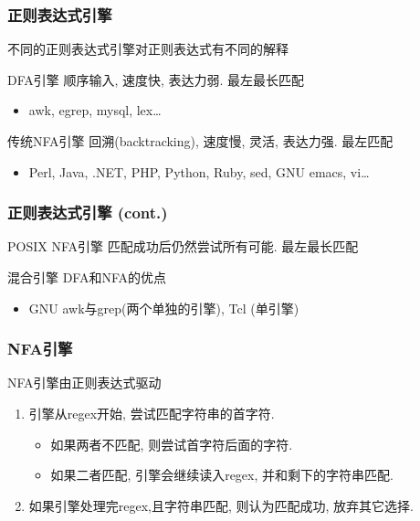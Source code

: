 \documentclass[compress]{beamer}
\begin{document}
\begin{frame}
\frametitle{正则表达式引擎}

不同的正则表达式引擎对正则表达式有不同的解释
\begin{block} {DFA引擎} 
顺序输入, 速度快, 表达力弱. 最左最长匹配
    \begin{itemize}
    \item awk, egrep, mysql, lex\ldots
    \end{itemize}
\end{block}

\begin{block}{传统NFA引擎} 
	回溯(backtracking), 速度慢, 灵活, 表达力强.  最左匹配
    \begin{itemize}
    \item Perl, Java, .NET, PHP, Python, Ruby, sed, GNU emacs, vi\ldots
    \end{itemize}
\end{block}
\end{frame}

\begin{frame}
\frametitle{正则表达式引擎 (cont.)}

\begin{block}{POSIX NFA引擎} 
匹配成功后仍然尝试所有可能. 最左最长匹配
\end{block}

\begin{block}{混合引擎} 
	DFA和NFA的优点
\begin{itemize}
	\item GNU awk与grep(两个单独的引擎), Tcl (单引擎)
\end{itemize}
\end{block}
\end{frame}

\begin{frame}
\frametitle{NFA引擎}

NFA引擎由正则表达式驱动

\begin{enumerate}
\item 引擎从regex开始, 尝试匹配字符串的首字符. 
  \begin{itemize}
	\item 如果两者不匹配, 则尝试首字符后面的字符.
	\item 如果二者匹配, 引擎会继续读入regex, 并和剩下的字符串匹配. 
  \end{itemize}
\item 如果引擎处理完regex,且字符串匹配, 则认为匹配成功, 放弃其它选择.
\end{enumerate}
\end{frame}
\end{document}
